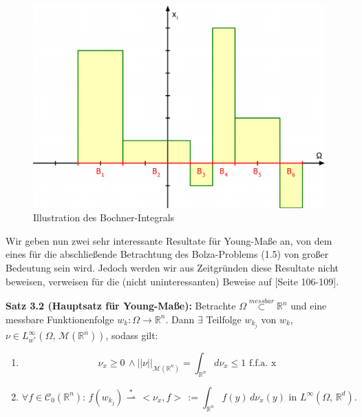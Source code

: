 \begin{figure}[!h]
    \centering
    \includegraphics[scale=0.4]{figures/BochnerOhneUrsprungPDF.pdf}
    \caption{Illustration des Bochner-Integrals}
    \label{fig:boch}
\end{figure}

Wir geben nun zwei sehr interessante Resultate für Young-Maße an, von dem eines für die abschließende Betrachtung des Bolza-Problems (1.5) von großer Bedeutung sein wird. Jedoch werden wir aus Zeitgründen diese Resultate nicht beweisen, verweisen für die (nicht uninteressanten) Beweise auf \cite{CalcVarBSchmidt}[Seite 106-109].\\
\colorbox{theored}{\begin{minipage}{16cm}{\textcolor{black}{}{\label{theo3.2}}}
\textbf{Satz 3.2 (Hauptsatz für Young-Maße):} Betrachte \(\Omega \stackrel{messbar}{\subset} \mathbb{R}^n\) und eine messbare Funktionenfolge \(w_k:\Omega \to \mathbb{R}^n\). Dann \(\exists\) Teilfolge \(w_{k_j}\) von \(w_k\), \(\nu \in L^{\infty}_{w^*}(\Omega,\,\mathcal{M}(\mathbb{R}^n))\), sodass gilt:
\begin{enumerate}
    \item \begin{equation}
        \nu_x \geq 0\, \land ||\nu||_{\mathcal{M}(\mathbb{R}^n)} = \int_{\mathbb{R}^n} d\nu_x \le 1\text{ f.f.a. x}
    \end{equation}
    \item \begin{equation}
        \forall f \in \mathcal{C}_0(\mathbb{R}^n):\, f(w_{k_j}) \stackrel{*}{\rightharpoonup} \,<\nu_x,f> \,:= \int_{\mathbb{R}^n} f(y)\,d\nu_x(y)\text{ in }L^{\infty}(\Omega,\,\mathbb{R}^d).
    \end{equation}
\end{enumerate}
\end{minipage}}\\


